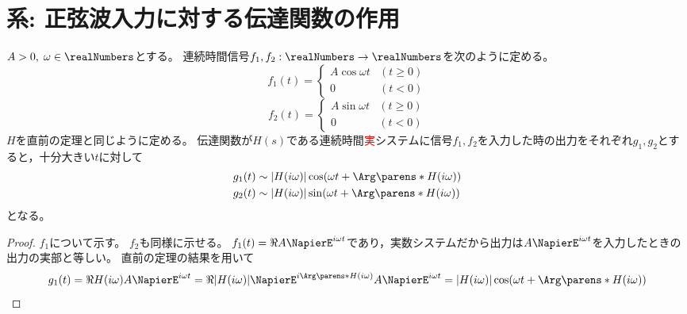         \section{系: 正弦波入力に対する伝達関数の作用}
            \begin{shadebox}
                $A>0,\;\omega \in \realNumbers$とする。
                連続時間信号$f_1,f_2: \realNumbers \to \realNumbers$を次のように定める。
                \[
                    f_1(t) =
                    \begin{cases}
                        A\cos\omega t & (t\geq 0) \\
                        0 & (t<0)
                    \end{cases}
                \]
                \[
                    f_2(t) =
                    \begin{cases}
                        A\sin\omega t & (t\geq 0) \\
                        0 & (t<0)
                    \end{cases}
                \]
                $H$を直前の定理と同じように定める。
                伝達関数が$H(s)$である連続時間\textcolor{red}{実}システムに信号$f_1,f_2$を入力した時の出力をそれぞれ$g_1,g_2$とすると，十分大きい$t$に対して
                \begin{align*}
                    g_1(t) &\sim |H(i\omega)|\cos(\omega t + \Arg\parens*{H(i\omega)}) \\
                    g_2(t) &\sim |H(i\omega)|\sin(\omega t + \Arg\parens*{H(i\omega)})
                \end{align*}
                となる。
            \end{shadebox}
            \begin{proof}
                \quad\par
                $f_1$について示す。
                $f_2$も同様に示せる。
                $f_1(t) = \Re{A\NapierE^{i\omega t}}$であり，実数システムだから出力は$A\NapierE^{i\omega t}$を入力したときの出力の実部と等しい。
                直前の定理の結果を用いて
                \[ g_1(t) = \Re{H(i\omega)A\NapierE^{i\omega t}} = \Re{|H(i\omega)|\NapierE^{i\Arg\parens*{H(i\omega)}}A\NapierE^{i\omega t}} = |H(i\omega)|\cos (\omega t + \Arg\parens*{H(i\omega)}) \]
            \end{proof}
